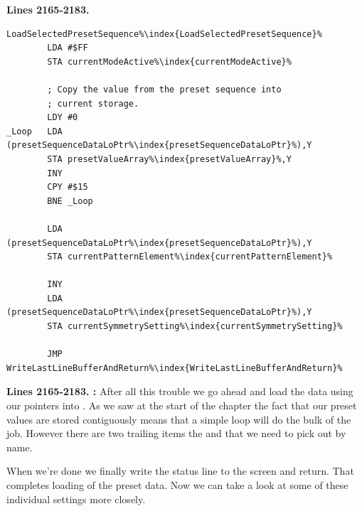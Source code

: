 \textbf{Lines 2165-2183. } 
\begin{lstlisting}[escapechar=\%]
LoadSelectedPresetSequence%\index{LoadSelectedPresetSequence}%    
        LDA #$FF
        STA currentModeActive%\index{currentModeActive}%

        ; Copy the value from the preset sequence into 
        ; current storage.
        LDY #0
_Loop   LDA (presetSequenceDataLoPtr%\index{presetSequenceDataLoPtr}%),Y
        STA presetValueArray%\index{presetValueArray}%,Y
        INY 
        CPY #$15
        BNE _Loop

        LDA (presetSequenceDataLoPtr%\index{presetSequenceDataLoPtr}%),Y
        STA currentPatternElement%\index{currentPatternElement}%

        INY 
        LDA (presetSequenceDataLoPtr%\index{presetSequenceDataLoPtr}%),Y
        STA currentSymmetrySetting%\index{currentSymmetrySetting}%

        JMP WriteLastLineBufferAndReturn%\index{WriteLastLineBufferAndReturn}%
\end{lstlisting}
\clearpage
\textbf{Lines 2165-2183. :} After all this trouble we go ahead and load the data using our pointers into 
. As we saw at the start of the chapter the fact that our preset values are stored contiguously means that a simple loop
will do the bulk of the job. However there are two trailing items the  and  that we need
to pick out by name. 

When we're done we finally write the status line to the screen and return. That completes loading of the preset data. Now we can take a look at some
of these individual settings more closely.

